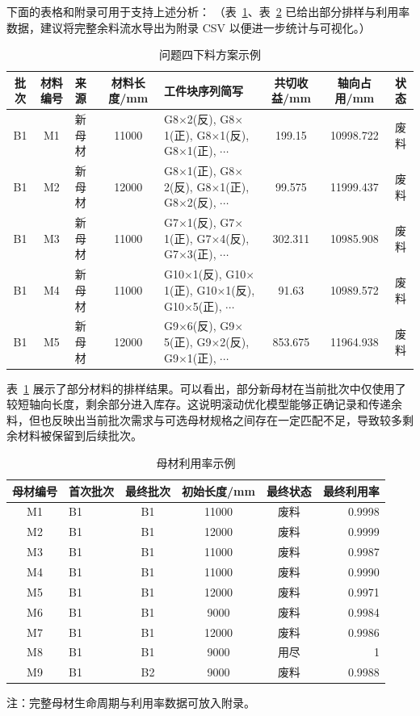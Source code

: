 \documentclass[UTF8]{ctexart}
\begin{document}
下面的表格和附录可用于支持上述分析：
（表~\ref{tab:q4_cutting}、表~\ref{tab:q4_util} 已给出部分排样与利用率数据，建议将完整余料流水导出为附录 CSV 以便进一步统计与可视化。）

\begin{table}[htbp]
\centering
\caption{问题四下料方案示例}
\label{tab:q4_cutting}
\begin{tabular}{cclcp{2.5cm}ccc}
\toprule
批次 & 材料编号 & 来源 & 材料长度/mm & 工件块序列简写 & 共切收益/mm & 轴向占用/mm & 状态 \\
\midrule
B1 & M1 & 新母材 & 11000 & G8$\times$2(反), G8$\times$1(正), G8$\times$1(反), G8$\times$1(正), $\cdots$ & 199.15 & 10998.722 & 废料 \\
B1 & M2 & 新母材 & 12000 & G8$\times$1(正), G8$\times$2(反), G8$\times$1(正), G8$\times$2(反), $\cdots$ & 99.575 & 11999.437 & 废料 \\
B1 & M3 & 新母材 & 11000 & G7$\times$1(反), G7$\times$1(正), G7$\times$4(反), G7$\times$3(正), $\cdots$ & 302.311 & 10985.908 & 废料 \\
B1 & M4 & 新母材 & 11000 & G10$\times$1(反), G10$\times$1(正), G10$\times$1(反), G10$\times$5(正), $\cdots$ & 91.63 & 10989.572 & 废料 \\
B1 & M5 & 新母材 & 12000 & G9$\times$6(反), G9$\times$5(正), G9$\times$2(反), G9$\times$1(正), $\cdots$ & 853.675 & 11964.938 & 废料 \\
\bottomrule
\end{tabular}
\end{table}

表~\ref{tab:q4_cutting} 展示了部分材料的排样结果。可以看出，部分新母材在当前批次中仅使用了较短轴向长度，剩余部分进入库存。这说明滚动优化模型能够正确记录和传递余料，但也反映出当前批次需求与可选母材规格之间存在一定匹配不足，导致较多剩余材料被保留到后续批次。

\begin{table}[htbp]
\centering
\caption{母材利用率示例}
\label{tab:q4_util}
\begin{tabular}{clcccr}
\toprule
母材编号 & 首次批次 & 最终批次 & 初始长度/mm & 最终状态 & 最终利用率 \\
\midrule
M1 & B1 & B1 & 11000 & 废料 & 0.9998 \\
M2 & B1 & B1 & 12000 & 废料 & 0.9999 \\
M3 & B1 & B1 & 11000 & 废料 & 0.9987 \\
M4 & B1 & B1 & 11000 & 废料 & 0.9990 \\
M5 & B1 & B1 & 12000 & 废料 & 0.9971 \\
M6 & B1 & B1 & 9000 & 废料 & 0.9984 \\
M7 & B1 & B1 & 12000 & 废料 & 0.9986 \\
M8 & B1 & B1 & 9000 & 用尽 & 1 \\
M9 & B1 & B2 & 9000 & 废料 & 0.9988 \\
\bottomrule
\end{tabular}
\par\medskip\footnotesize 注：完整母材生命周期与利用率数据可放入附录。
\end{table}
\end{document}
